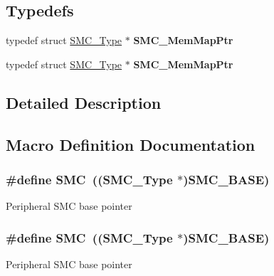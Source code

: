 \subsection*{Typedefs}
\begin{DoxyCompactItemize}
\item 
typedef struct \hyperlink{structSMC__Type}{S\+M\+C\+\_\+\+Type} $\ast$ {\bfseries S\+M\+C\+\_\+\+Mem\+Map\+Ptr}\hypertarget{group__SMC__Peripheral__Access__Layer_ga37188a60163a816cb6fa751b2400d9ee}{}\label{group__SMC__Peripheral__Access__Layer_ga37188a60163a816cb6fa751b2400d9ee}

\item 
typedef struct \hyperlink{structSMC__Type}{S\+M\+C\+\_\+\+Type} $\ast$ {\bfseries S\+M\+C\+\_\+\+Mem\+Map\+Ptr}\hypertarget{group__SMC__Peripheral__Access__Layer_ga37188a60163a816cb6fa751b2400d9ee}{}\label{group__SMC__Peripheral__Access__Layer_ga37188a60163a816cb6fa751b2400d9ee}

\end{DoxyCompactItemize}


\subsection{Detailed Description}


\subsection{Macro Definition Documentation}
\subsubsection[{\texorpdfstring{S\+MC}{SMC}}]{\setlength{\rightskip}{0pt plus 5cm}\#define S\+MC~(({\bf S\+M\+C\+\_\+\+Type} $\ast$){\bf S\+M\+C\+\_\+\+B\+A\+SE})}\hypertarget{group__SMC__Peripheral__Access__Layer_ga6667e81e5b32250febd3d46511d9309d}{}\label{group__SMC__Peripheral__Access__Layer_ga6667e81e5b32250febd3d46511d9309d}
Peripheral S\+MC base pointer 
\subsubsection[{\texorpdfstring{S\+MC}{SMC}}]{\setlength{\rightskip}{0pt plus 5cm}\#define S\+MC~(({\bf S\+M\+C\+\_\+\+Type} $\ast$){\bf S\+M\+C\+\_\+\+B\+A\+SE})}\hypertarget{group__SMC__Peripheral__Access__Layer_ga6667e81e5b32250febd3d46511d9309d}{}\label{group__SMC__Peripheral__Access__Layer_ga6667e81e5b32250febd3d46511d9309d}
Peripheral S\+MC base pointer 

